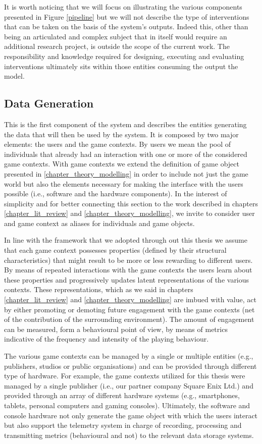 It is worth noticing that we will focus on illustrating the various components presented in Figure \ref{pipeline} but we will not describe the type of interventions that can be taken on the basis of the system's outputs. Indeed this, other than being an articulated and complex subject that in itself would require an additional research project, is outside the scope of the current work. The responsibility and knowledge required for designing, executing and evaluating interventions ultimately sits within those entities consuming the output the model.

\subsection{Data Generation}
\label{data_generation}
This is the first component of the system and describes the entities generating the data that will then be used by the system. It is composed by two major elements: the users and the game contexts. By users we mean the pool of individuals that already had an interaction with one or more of the considered game contexts. With game contexts we extend the definition of game object presented in \ref{chapter_theory_modelling} in order to include not just the game world but also the elements necessary for making the interface with the users possible (i.e., software and the hardware components). In the interest of simplicity and for better connecting this section to the work described in chapters \ref{chapter_lit_review} and \ref{chapter_theory_modelling}, we invite to consider user and game context as aliases for individuals and game objects.

In line with the framework that we adopted through out this thesis we assume that each game context possesses properties (defined by their structural characteristics) that might result to be more or less rewarding to different users. By means of repeated interactions with the game contexts the users learn about these properties and progressively updates latent representations of the various contexts. These representations, which as we said in chapters \ref{chapter_lit_review} and \ref{chapter_theory_modelling} are imbued with value, act by either promoting or demoting future engagement with the game contexts (net of the contribution of the surrounding environment). The amount of engagement can be measured, form a behavioural point of view, by means of metrics indicative of the frequency and intensity of the playing behaviour.

The various game contexts can be managed by a single or multiple entities (e.g., publishers, studios or public organisations) and can be provided through different type of hardware. For example, the game contexts utilized for this thesis were managed by a single publisher (i.e., our partner company Square Enix Ltd.) and provided through an array of different hardware systems (e.g., smartphones, tablets, personal computers and gaming consoles). Ultimately, the software and console hardware not only generate the game object with which the users interact but also support the telemetry system in charge of recording, processing and transmitting metrics (behavioural and not) to the relevant data storage systems.

